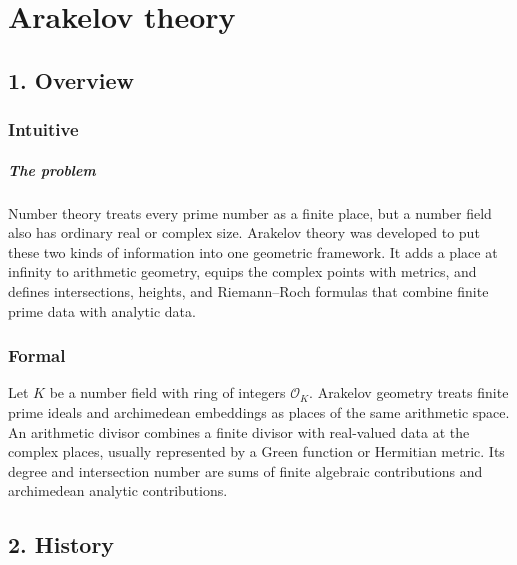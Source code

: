 \clearpage\chapter{Arakelov theory}
\section*{1. Overview}
\subsection*{Intuitive}
\paragraph{The problem}

Number theory treats every prime number as a finite place, but a number field also has ordinary real or complex size. Arakelov theory was developed to put these two kinds of information into one geometric framework. It adds a place at infinity to arithmetic geometry, equips the complex points with metrics, and defines intersections, heights, and Riemann--Roch formulas that combine finite prime data with analytic data.



\subsection*{Formal}
Let $K$ be a number field with ring of integers $\mathcal O_K$. Arakelov geometry treats finite prime ideals and archimedean embeddings as places of the same arithmetic space. An arithmetic divisor combines a finite divisor with real-valued data at the complex places, usually represented by a Green function or Hermitian metric. Its degree and intersection number are sums of finite algebraic contributions and archimedean analytic contributions.
\section*{2. History}
